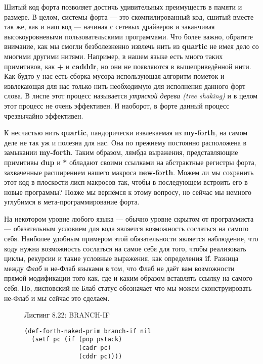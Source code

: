 Шитый код форта позволяет достичь удивительных преимуществ в памяти и размере. В целом, системы форта --- это скомпилированный код, сшитый вместе так же, как и наш код --- начиная с сетевых драйверов и заканчивая высокоуровневыми пользовательскими программами. Что более важно, обратите внимание, как мы смогли безболезненно извлечь нить из \textbf{quartic} не имея дело со многими другими нитями. Например, в нашем языке есть много таких примитивов, как \textbf{+} и \textbf{cadddr}, но они не появляются в вышеприведённой нити. Как будто у нас есть сборка мусора использующая алгоритм пометок и извлекающая для нас только нить необходимую для исполнения данного форт слова. В лиспе этот процесс называется \emph{утряской дерева (tree shaking)} и в целом этот процесс не очень эффективен. И наоборот, в форте данный процесс чрезвычайно эффективен.

К несчастью нить \textbf{quartic}, пандорически извлекаемая из \textbf{my-forth}, на самом деле не так уж и полезна для нас. Она по прежнему постоянно расположена в замыкании \textbf{my-forth}. Таким образом, лямбда выражения, представляющие примитивы \textbf{dup} и \textbf{*} обладают своими ссылками на абстрактные регистры форта, захваченные расширением нашего макроса \textbf{new-forth}. Можем ли мы сохранить этот код в плоскости лисп макросов так, чтобы в последующем встроить его в новые программы? Позже мы вернёмся к этому вопросу, но сейчас мы немного углубимся в мета-программирование форта.

На некотором уровне любого языка --- обычно уровне скрытом от программиста --- обязательным условием для кода является возможность сослаться на самого себя. Наиболее удобным примером этой обязательности является наблюдение, что коду нужна возможность сослаться на самое себя для того, чтобы реализовать циклы, рекурсии и такие условные выражения, как определения \textbf{if}. Разница между \emph{Флаб} и не-Флаб языками в том, что Флаб не даёт вам возможности прямой модификации того как, где и каким образом вставлять ссылку на самого себя. Но, лисповский не-Блаб статус обозначает что мы можем сконструировать не-Флаб и мы сейчас это сделаем.

\begin{figure}Листинг 8.22: BRANCH-IF\label{listing_8.22}
\listbegin
\begin{verbatim}
(def-forth-naked-prim branch-if nil
  (setf pc (if (pop pstack)
               (cadr pc)
               (cddr pc))))
\end{verbatim}
\listend
\end{figure}

